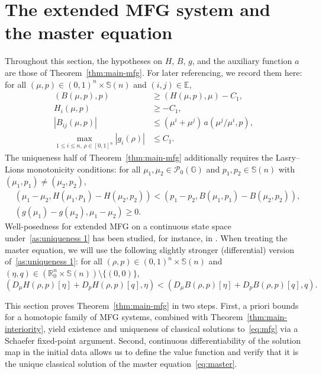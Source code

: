 \documentclass[10pt]{article}
\numberwithin{equation}{section}
\newcommand{\cP}{ \mathcal{P}}
\newcommand{\bE}{\mathbb E}
\newcommand{\bR}{\mathbb R}
\newcommand{\bS}{\mathbb S}
\def\G{\mathbb{G}}
\begin{document}
%
%
%
\section{The extended MFG system and the master equation}\label{sec:classical}
Throughout this section, the hypotheses on $H$, $B$, $g$, and the auxiliary function $a$ are those of Theorem~\ref{thm:main-mfg}. For later referencing, we record them here: for all $(\mu,p)\in(0,1)^n\times\bS(n)$ and $(i,j)\in\bE$,
\begin{align}
 (B(\mu,p),p)&\geq (H(\mu,p),\mu)-C_1, \label{as:B coercivity}\\
 H_i(\mu,p)&\geq -C_1, \label{as:H lower bound}\\
 |B_{ij}(\mu,p)|&\leq (\mu^i+\mu^j)\,a(\mu^j/\mu^i,p), \label{eq:mobility-dominated flux}\\
 \max_{1\leq i\leq n,\,\rho\in[0,1]^n}|g_i(\rho)|&\leq C_1. \label{as:g mu}
\end{align}
The uniqueness half of Theorem~\ref{thm:main-mfg} additionally requires the Lasry--Lions monotonicity conditions: for all $\mu_1,\mu_2\in\cP_0(\G)$ and $p_1,p_2\in\bS(n)$ with $(\mu_1,p_1)\neq(\mu_2,p_2)$,
\begin{align}
& (\mu_1-\mu_2,H(\mu_1,p_1)-H(\mu_2,p_2))< (p_1-p_2,B(\mu_1,p_1)-B(\mu_2,p_2)),\label{as:uniqueness 1}\\
& (g(\mu_1)-g(\mu_2),\mu_1-\mu_2)\geq 0.\label{as:uniqueness 2}
\end{align}
Well-posedness for extended MFG on a continuous state space under~\eqref{as:uniqueness 1} has been studied, for instance, in \cite{LiSo20,Mun23}. When treating the master equation, we will use the following slightly stronger (differential) version of~\eqref{as:uniqueness 1}: for all $(\rho,p)\in(0,1)^n\times\bS(n)$ and $(\eta,q)\in(\bR^n_0\times\bS(n))\setminus\{(0,0)\}$,
\begin{equation}\label{as:uniqueness 3}
(D_\mu H(\rho,p)[\eta] + D_p H(\rho,p)[q], \eta) < (D_\mu B(\rho,p)[\eta] + D_p B(\rho,p)[q], q).
\end{equation}


This section proves Theorem~\ref{thm:main-mfg} in two steps. First, a priori bounds for a homotopic family of MFG systems, combined with Theorem~\ref{thm:main-interiority}, yield existence and uniqueness of classical solutions to~\eqref{eq:mfg} via a Schaefer fixed-point argument. Second, continuous differentiability of the solution map in the initial data allows us to define the value function and verify that it is the unique classical solution of the master equation~\eqref{eq:master}.
\end{document}
